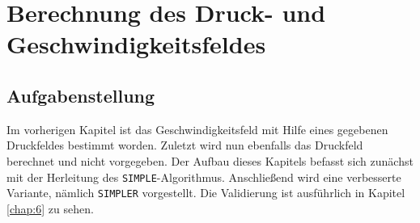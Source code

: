 \chapter{Berechnung des Druck- und Geschwindigkeitsfeldes}

\section{Aufgabenstellung}
Im vorherigen Kapitel ist das Geschwindigkeitsfeld mit Hilfe eines gegebenen Druckfeldes bestimmt worden. Zuletzt wird nun ebenfalls das Druckfeld berechnet und nicht vorgegeben. Der Aufbau dieses Kapitels befasst sich zun\"achst mit der Herleitung des \texttt{SIMPLE}-Algorithmus. Anschlie\ss{}end wird eine verbesserte Variante, n\"amlich \texttt{SIMPLER} vorgestellt. Die Validierung ist ausf\"uhrlich in Kapitel \ref{chap:6} zu sehen.



